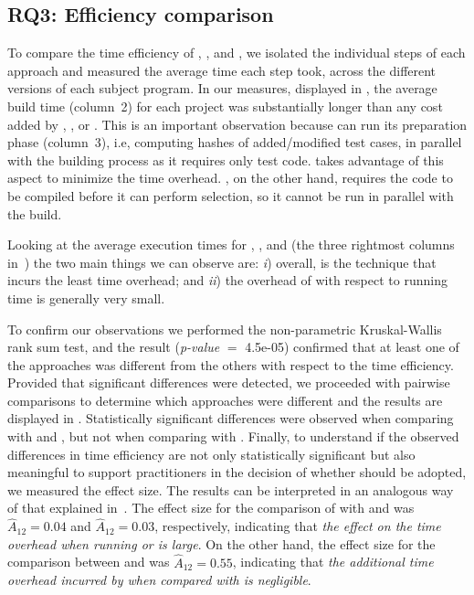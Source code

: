 \subsection{RQ3: Efficiency comparison}
\label{subsec:rq3}
To compare the time efficiency of \ek, \fs, and \fz, 
we isolated the individual steps of each approach and measured the average time each step took, across the different versions of each subject program. 
In our measures, displayed in , 
the average build time (column~2) for each project was substantially longer than any cost added by \ek, \fs, or \fz.
This is an important observation because \fs can run its preparation phase (column~3), i.e, computing hashes of added/modified test cases, in parallel with the building process as it requires only test code.
\fz takes advantage of this aspect to minimize the time overhead. %
\ek, on the other hand, requires the code to be compiled before it can perform selection, so it cannot be run in parallel with the build.





Looking at the average execution times for \fs, \ek, and \fz 
(the three rightmost columns in~) 
the two main things we can observe are: 
\textit{i}) overall, \fs is the technique that incurs the least time overhead;
and \textit{ii}) the overhead of \fz with respect to \ek running time is generally very small.

To confirm our observations we performed the non-parametric Kruskal-Wallis rank sum test, 
and the result (\textit{p-value} $=$ 4.5e-05) confirmed that at least one of the approaches was different from the others with respect to the time efficiency.
Provided that significant differences were detected, we proceeded with pairwise comparisons to determine which approaches were different
and the results are displayed in .
Statistically significant differences were observed when comparing \fs with \ek and \fz, but not when comparing \fz with \ek.
Finally, to understand if the observed differences in time efficiency are not only statistically significant but also meaningful to support practitioners in the decision of whether \fz should be adopted, we measured the effect size.
The results can be interpreted in an analogous way of that explained in~.
The effect size for the comparison of \fs with \ek and \fz was $\hat{A}_{12}=0.04$ and $\hat{A}_{12}=0.03$, respectively, indicating that \emph{the effect on the time overhead when running \ek or \fz is large}.
On the other hand, the effect size for the comparison between \fz and \ek was $\hat{A}_{12}=0.55$, indicating that \emph{the additional time overhead incurred by \fz when compared with \ek is negligible}.

